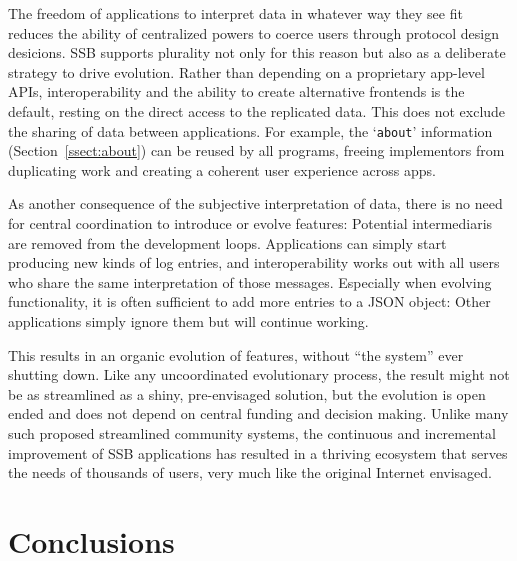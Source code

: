 \documentclass[10pt,sigconf]{acmart}
\begin{document}

The freedom of applications to interpret data in whatever way they see fit reduces the ability of centralized powers to coerce users through protocol design desicions. SSB supports plurality not only for this reason but also as a deliberate strategy to drive evolution. Rather than depending on a proprietary app-level APIs, interoperability and the ability to create alternative frontends is the default, resting on the direct access to the replicated data. This does not exclude the sharing of data between applications. For example, the `{\small\tt about}' information (Section~\ref{ssect:about}) can be reused by all programs, freeing implementors from duplicating work and creating a coherent user experience across apps.

As another consequence of the subjective interpretation of data, there is no need for central coordination to introduce or evolve features: Potential intermediaris are removed from the development loops. Applications can simply start producing new kinds of log entries, and interoperability works out with all users who share the same interpretation of those messages. Especially when evolving functionality, it is often sufficient to add more entries to a JSON object: Other applications simply ignore them but will continue working.

This results in an organic evolution of features, without ``the system'' ever shutting down. Like any uncoordinated evolutionary process, the result might not be as streamlined as a shiny, pre-envisaged solution, but the evolution is open ended and does not depend on central funding and decision making. Unlike many such proposed streamlined community systems, the continuous and incremental improvement of SSB applications has resulted in a thriving ecosystem that serves the needs of thousands of users, very much like the original Internet envisaged. %


\section{Conclusions}
\end{document}

